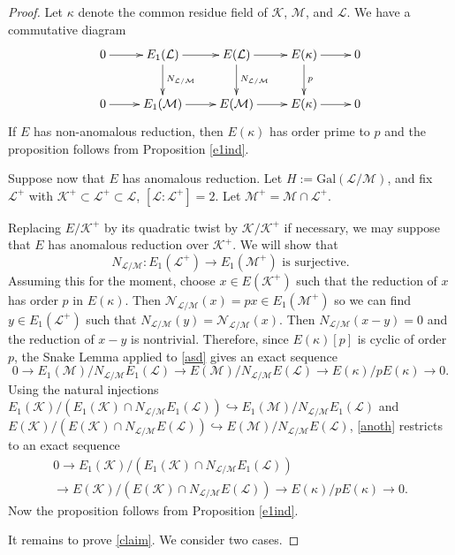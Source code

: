 \documentclass[reqno]{amsart}
\theoremstyle{definition}
\def\K{\mathcal{K}}
\def\L{\mathcal{L}}
\def\M{\mathcal{M}}
\def\N{\mathcal{N}}
\def\Gal{\mathrm{Gal}}
\def\hookto{\hookrightarrow}
\begin{document}
\begin{proof}
Let $\kappa$ denote the common residue field of $\K$, $\M$, and $\L$.  
We have a commutative diagram
\begin{equation}
\label{asd}
\parbox{4in}{\xymatrix{
0 \ar[r] & E_1(\L) \ar[r] \ar^{N_{\L/\M}}[d] & E(\L) \ar[r] \ar^{N_{\L/\M}}[d] 
    & E(\kappa) \ar[r] \ar^{p}[d] & 0 \\
0 \ar[r] & E_1(\M) \ar[r] & E(\M) \ar[r] & E(\kappa) \ar[r] & 0
}}
\end{equation}
If $E$ has non-anomalous reduction, then $E(\kappa)$ has order prime to $p$ and 
the proposition follows from Proposition \ref{e1ind}.

Suppose now that $E$ has anomalous reduction.  
Let $H := \Gal(\L/\M)$, and fix $\L^+$ with 
$\K^+ \subset \L^+ \subset \L$, $[\L:\L^+] = 2$.  Let $\M^+ = \M \cap \L^+$.  

Replacing $E/\K^+$ by its quadratic twist by $\K/\K^+$ if necessary, 
we may suppose that $E$ has anomalous reduction over $\K^+$.
We will show that 
\begin{equation}
\label{claim}
\text{$N_{\L/\M} : E_1(\L^+) \to E_1(\M^+)$ is surjective.}
\end{equation}
Assuming this for the moment, choose $x \in E(\K^+)$ 
such that the reduction of $x$ has order $p$ in $E(\kappa)$.  Then 
$\N_{\L/\M}(x) = px \in E_1(\M^+)$ so we 
can find $y \in E_1(\L^+)$ such that $N_{\L/\M}(y) = \N_{\L/\M}(x)$.  
Then $N_{\L/\M}(x-y) = 0$ and the reduction of $x-y$ is nontrivial.  
Therefore, 
since $E(\kappa)[p]$ is cyclic of order $p$, the Snake Lemma applied 
to \eqref{asd} gives an exact sequence
\begin{equation}
\label{anoth}
0 \to E_1(\M)/N_{\L/\M}E_1(\L) \to E(\M)/N_{\L/\M}E(\L) 
    \to E(\kappa)/p E(\kappa) \to 0.
\end{equation}
Using the natural injections 
$E_1(\K)/(E_1(\K) \cap N_{\L/\M}E_1(\L)) \hookto E_1(\M)/N_{\L/\M}E_1(\L)$ 
and $E(\K)/(E(\K) \cap N_{\L/\M}E(\L)) \hookto E(\M)/N_{\L/\M}E(\L)$, 
\eqref{anoth} restricts to an exact sequence
\begin{multline*}
0 \to E_1(\K)/(E_1(\K) \cap N_{\L/\M}E_1(\L)) \\
    \to E(\K)/(E(\K) \cap N_{\L/\M}E(\L)) 
    \to E(\kappa)/p E(\kappa) \to 0.
\end{multline*}
Now the proposition follows from Proposition \ref{e1ind}.

It remains to prove \eqref{claim}.
We consider two cases.  


\end{proof}
\end{document}
